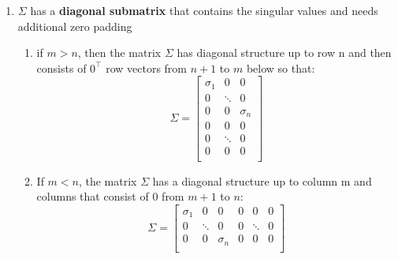 \begin{enumerate}
\begin{enumerate}
        \item $\Sigma$  has a \textbf{diagonal submatrix} that contains the singular values and needs additional zero padding
        \begin{enumerate}
            \item if $m > n$, then the matrix $\Sigma$  has diagonal structure up to row n and then consists of $0^\top$ row vectors from $n + 1$ to $m$ below so that:
            \[
                \Sigma =
                \begin{bmatrix}
                    \sigma_1 & 0 & 0\\
                    0 & \ddots & 0\\
                    0 & 0 & \sigma_n\\
                    0 & 0 & 0\\
                    0 & \ddots & 0\\
                    0 & 0 & 0\\
                \end{bmatrix}
            \]
    
            \item If $m < n$, the matrix $\Sigma$  has a diagonal structure up to column m and columns that consist of $0$ from $m + 1$ to $n$:
            \[
                \Sigma =
                \begin{bmatrix}
                    \sigma_1 & 0 & 0 & 0 & 0 & 0 \\
                    0 & \ddots & 0 & 0 & \ddots & 0\\
                    0 & 0 & \sigma_n & 0 & 0 & 0\\
                \end{bmatrix}
            \]
        \end{enumerate}
    \end{enumerate}
   
\end{enumerate}


